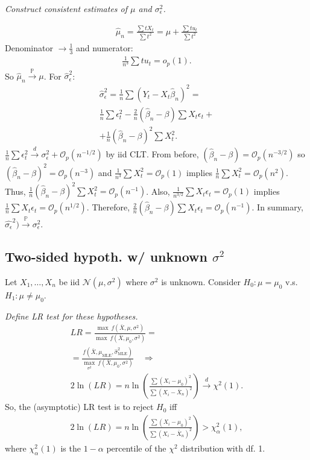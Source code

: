 \documentclass[9pt]{extarticle}
\newcommand{\PP}{\mathbb{P}}
\newcommand{\OO}{\mathcal{O}}
\newcommand{\darrow}{\overset{d}{\rightarrow}}
\newcommand{\parrow}{\overset{\PP}{\rightarrow}}
\begin{document}
\begin{multicols*}{4}
\emph{Construct consistent estimates of $\mu$ and $\sigma_\epsilon^2$.}

\begin{gather*}
    \hat{\mu}_n = \frac{\sum t X_t}{\sum t^2} = \mu + \frac{\sum t u_t}{\sum t^2}
\end{gather*}
Denominator $\rightarrow \frac{1}{3}$ and numerator:
\begin{gather*}
    \frac{1}{n^3} \sum t u_t = o_p(1).
\end{gather*}
So $\hat{\mu}_n \parrow \mu$. For $\hat{\sigma}_\epsilon^2$:
\begin{gather*}
    \hat{\sigma}_\epsilon^2 = \frac{1}{n} \sum (Y_t - X_t \hat{\beta}_n)^2 = \\ 
    \frac{1}{n} \sum \epsilon_t^2 - \frac{2}{n} (\hat{\beta}_n - \beta) \sum X_t \epsilon_t + \\
    + \frac{1}{n}(\hat{\beta}_n - \beta)^2  \sum X_t^2.
\end{gather*}
$\frac{1}{n} \sum \epsilon_t^2 \darrow \sigma_\epsilon^2 + \OO_p(n^{-1/2})$ by iid CLT. From before, $(\hat{\beta}_n - \beta) = \OO_p(n^{-3/2})$ so $(\hat{\beta}_n - \beta)^2 = \OO_p(n^{-3})$ and $\frac{1}{n^3} \sum X_t^2 = \OO_p(1)$ implies $\frac{1}{n} \sum X_t^2 = \OO_p(n^2)$. Thus, $\frac{1}{n}(\hat{\beta}_n - \beta)^2 \sum X_t^2 = \OO_p(n^{-1})$. Also, $\frac{1}{n^{3/2}} \sum X_t \epsilon_t = \OO_p(1)$ implies $\frac{1}{n} \sum X_t \epsilon_t = \OO_p(n^{1/2})$. Therefore, $\frac{2}{n} (\hat{\beta}_n - \beta) \sum X_t \epsilon_t = \OO_p(n^{-1})$. In summary, $\hat{\sigma_\epsilon}^2) \parrow \sigma_\epsilon^2$.

\subsection*{Two-sided hypoth. w/ unknown $\sigma^2$}
Let $X_1, \ldots{}, X_n$ be iid $\mathcal{N}(\mu, \sigma^2)$ where $\sigma^2$ is unknown. Consider $H_0 : \mu = \mu_0$ v.s. $H_1 : \mu \neq \mu_0$.

\emph{Define LR test for these hypotheses.}
\begin{gather*}
    LR = \frac{\max~f(\bar{X}, \mu, \sigma^2)}{\max~f(\bar{X}, \mu_0, \sigma^2)} = \\ 
    = \frac{f(\bar{X}, \mu_{\text{MLE}}, \hat{\sigma}^2_{\text{MLE}})}{\max_{\sigma^2}~f(\bar{X}, \mu_0, \sigma^2)} \quad \Rightarrow \\
    2\ln(LR) = n \ln\left(\frac{\sum (X_i - \mu_0)^2}{\sum (X_i - \bar{X}_n)^2}\right) \darrow \chi^2(1).
\end{gather*}
So, the (asymptotic) LR test is to reject $H_0$ iff
\begin{gather*}
    2\ln(LR) = n \ln\left(\frac{\sum (X_i - \mu_0)^2}{\sum (X_i - \bar{X}_n)^2}\right) > \chi_\alpha^2(1),
\end{gather*}
where $\chi^2_\alpha(1)$ is the $1-\alpha$ percentile of the $\chi^2$ distribution with df. 1.


\end{multicols*}
\end{document}
